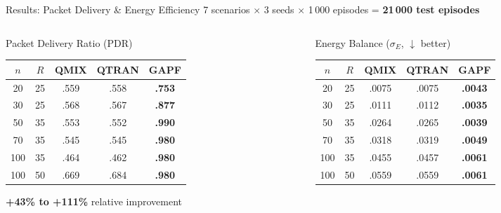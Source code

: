\documentclass[aspectratio=169, 11pt]{beamer}
\begin{document}
\begin{frame}{Results: Packet Delivery \& Energy Efficiency}
  {\small 7 scenarios $\times$ 3 seeds $\times$ 1\,000 episodes = \textbf{21\,000 test episodes}}

\begin{columns}[T]
\begin{column}{0.48\textwidth}

  \begin{block}{Packet Delivery Ratio (PDR)}
  \centering
  \footnotesize
  \renewcommand{\arraystretch}{1.1}
  \begin{tabular}{cc|cc|>{\bfseries}c}
    \toprule
    $n$ & $R$ & QMIX & QTRAN & GAPF \\
    \midrule
    20  & 25 & .559 & .558 & \textbf{.753} \\
    30  & 25 & .568 & .567 & \textbf{.877} \\
    50  & 35 & .553 & .552 & \textbf{.990} \\
    70  & 35 & .545 & .545 & \textbf{.980} \\
    100 & 35 & .464 & .462 & \textbf{.980} \\
    100 & 50 & .669 & .684 & \textbf{.980} \\
    \bottomrule
  \end{tabular}

  \vspace{4pt}
  \textcolor{polygreen}{\textbf{+43\% to +111\%}} relative improvement
  \end{block}

\end{column}
\begin{column}{0.48\textwidth}

  \begin{block}{Energy Balance ($\sigma_E$, $\downarrow$ better)}
  \centering
  \footnotesize
  \renewcommand{\arraystretch}{1.1}
  \begin{tabular}{cc|cc|>{\bfseries}c}
    \toprule
    $n$ & $R$ & QMIX & QTRAN & GAPF \\
    \midrule
    20  & 25 & .0075 & .0075 & \textbf{.0043} \\
    30  & 25 & .0111 & .0112 & \textbf{.0035} \\
    50  & 35 & .0264 & .0265 & \textbf{.0039} \\
    70  & 35 & .0318 & .0319 & \textbf{.0049} \\
    100 & 35 & .0455 & .0457 & \textbf{.0061} \\
    100 & 50 & .0559 & .0559 & \textbf{.0061} \\
    \bottomrule
  \end{tabular}


\end{block}
\end{column}
\end{columns}
\end{frame}
\end{document}
